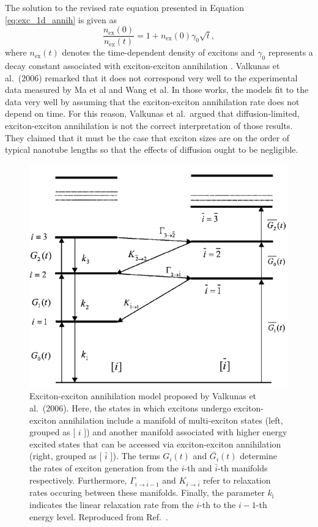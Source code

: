 The solution to the revised rate equation presented in Equation \eqref{eq:exc_1d_annih} is given as
\begin{equation}
	\frac{n_\text{ex}(0)}{n_\text{ex}(t)} = 1 + n_\text{ex}(0) \gamma_0 \sqrt{t},
\end{equation}
where $n_\text{ex}(t)$ denotes the time-dependent density of excitons and $\gamma_0$ represents a decay constant associated with exciton-exciton annihilation \cite{valkunas2006exciton}. Valkunas et al.\ (2006) remarked that it does not correspond very well to the experimental data measured by Ma et al and Wang et al. In those works, the models fit to the data very well by assuming that the exciton-exciton annihilation rate does not depend on time. For this reason, Valkunas et al.\ argued that diffusion-limited, exciton-exciton annihilation is not the correct interpretation of those results. They claimed that it must be the case that exciton sizes are on the order of typical nanotube lengths so that the effects of diffusion ought to be negligible.

\begin{figure}[H]
	\centering
	\includegraphics[scale=0.5]{images/chapter_prior_works/exciton_manifold_valkunas_2006}
	\caption{Exciton-exciton annihilation model proposed by Valkunas et al.\ (2006). Here, the states in which excitons undergo exciton-exciton annihilation include a manifold of multi-exciton states (left, grouped as [ $i$ ]) and another manifold associated with higher energy excited states that can be accessed via exciton-exciton annihilation (right, grouped as [ $\bar{i}$ ]). The terms $G_{i}(t)$ and $\bar{G_{i}}(t)$ determine the rates of exciton generation from the $i$-th and $\bar{i}$-th manifolds respectively. Furthermore, $\Gamma_{i \rightarrow \bar{i}-1}$ and $K_{i \rightarrow \bar{i}}$ refer to relaxation rates occuring between these manifolds. Finally, the parameter $k_\text{i}$ indicates the linear relaxation rate from the $i$-th to the $i-1$-th energy level. Reproduced from Ref.\ \cite{valkunas2006exciton}. }
	\label{fig:exciton_manif_valkunas}
\end{figure}

